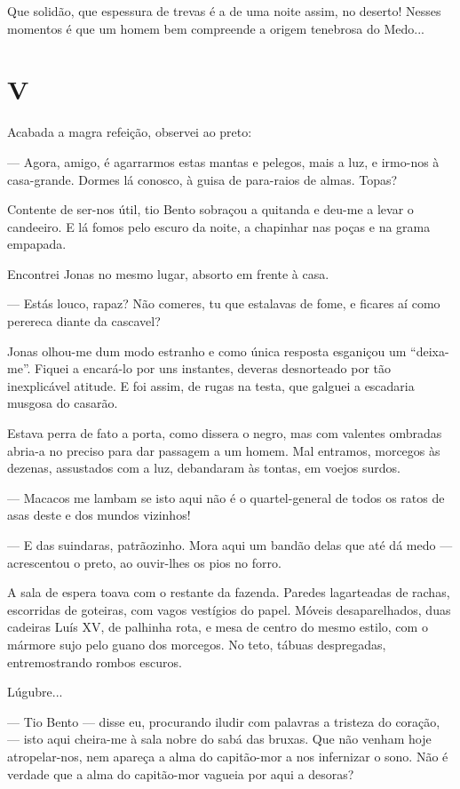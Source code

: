 Que solidão, que espessura de trevas é a de uma noite assim, no deserto!
Nesses momentos é que um homem bem compreende a origem tenebrosa do
Medo...

\section{V}

Acabada a magra refeição, observei ao preto:

--- Agora, amigo, é agarrarmos estas mantas e pelegos, mais a luz, e
irmo-nos à casa-grande. Dormes lá conosco, à guisa de para-raios de
almas. Topas?

Contente de ser-nos útil, tio Bento sobraçou a quitanda e deu-me a levar
o candeeiro. E lá fomos pelo escuro da noite, a chapinhar nas poças e na
grama empapada.

Encontrei Jonas no mesmo lugar, absorto em frente à casa.

--- Estás louco, rapaz? Não comeres, tu que estalavas de fome, e ficares
aí como perereca diante da cascavel?

Jonas olhou-me dum modo estranho e como única resposta esganiçou um
``deixa-me''. Fiquei a encará-lo por uns instantes, deveras desnorteado
por tão inexplicável atitude. E foi assim, de rugas na testa, que
galguei a escadaria musgosa do casarão.

Estava perra de fato a porta, como dissera o negro, mas com valentes
ombradas abria-a no preciso para dar passagem a um homem. Mal entramos,
morcegos às dezenas, assustados com a luz, debandaram às tontas, em
voejos surdos.

--- Macacos me lambam se isto aqui não é o quartel-general de todos os
ratos de asas deste e dos mundos vizinhos!

--- E das suindaras, patrãozinho. Mora aqui um bandão delas que até dá
medo --- acrescentou o preto, ao ouvir-lhes os pios no forro.

A sala de espera toava com o restante da fazenda. Paredes lagarteadas de
rachas, escorridas de goteiras, com vagos vestígios do papel. Móveis
desaparelhados, duas cadeiras Luís XV, de palhinha rota, e mesa de
centro do mesmo estilo, com o mármore sujo pelo guano dos morcegos. No
teto, tábuas despregadas, entremostrando rombos escuros.

Lúgubre...

--- Tio Bento --- disse eu, procurando iludir com palavras a tristeza do
coração, --- isto aqui cheira-me à sala nobre do sabá das bruxas. Que
não venham hoje atropelar-nos, nem apareça a alma do capitão-mor a nos
infernizar o sono. Não é verdade que a alma do capitão-mor vagueia por
aqui a desoras?


